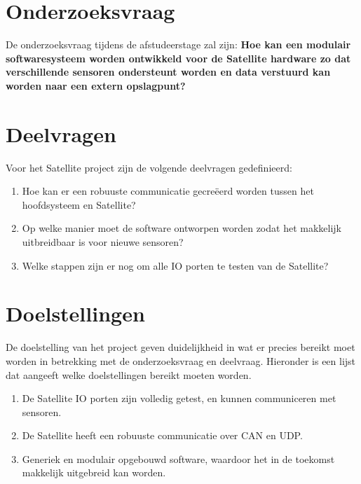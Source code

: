 \section{Onderzoeksvraag}
De onderzoeksvraag tijdens de afstudeerstage zal zijn: \textbf{Hoe kan een modulair softwaresysteem worden ontwikkeld voor de Satellite hardware zo dat verschillende sensoren ondersteunt worden en data verstuurd kan worden naar een extern opslagpunt?}

\section{Deelvragen}
Voor het Satellite project zijn de volgende deelvragen gedefinieerd:
\begin{enumerate}
	\item Hoe kan er een robuuste  communicatie gecreëerd worden tussen het hoofdsysteem en Satellite?
	\item Op welke manier moet de software ontworpen worden zodat het makkelijk uitbreidbaar is voor nieuwe sensoren?
	\item Welke stappen zijn er nog om alle IO porten te testen van de Satellite?
\end{enumerate}

\section{Doelstellingen}
De doelstelling van het project geven duidelijkheid in wat er precies bereikt moet worden in betrekking met de onderzoeksvraag en deelvraag. Hieronder is een lijst dat aangeeft welke doelstellingen bereikt moeten worden.
\begin{enumerate}
	\item De Satellite IO porten zijn volledig getest, en kunnen communiceren met sensoren.
	\item De Satellite heeft een robuuste communicatie over CAN en UDP. 
	\item Generiek en modulair opgebouwd software, waardoor het in de toekomst makkelijk uitgebreid kan worden.
\end{enumerate}

